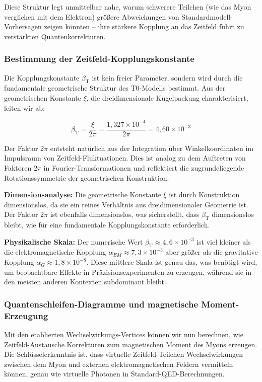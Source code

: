 \documentclass[12pt,a4paper]{article}
\newcommand{\betaT}{\beta_{\text{T}}}
\newcommand{\xipar}{\xi}
\begin{document}
	Diese Struktur legt unmittelbar nahe, warum schwerere Teilchen (wie das Myon verglichen mit dem Elektron) größere Abweichungen von Standardmodell-Vorhersagen zeigen könnten -- ihre stärkere Kopplung an das Zeitfeld führt zu verstärkten Quantenkorrekturen.
	
	\subsubsection{Bestimmung der Zeitfeld-Kopplungskonstante}
	
	Die Kopplungskonstante $\betaT$ ist kein freier Parameter, sondern wird durch die fundamentale geometrische Struktur des T0-Modells bestimmt. Aus der geometrischen Konstante $\xipar$, die dreidimensionale Kugelpackung charakterisiert, leiten wir ab:
	
	\begin{equation}
		\betaT = \frac{\xipar}{2\pi} = \frac{1{,}327 \times 10^{-4}}{2\pi} = 4{,}60 \times 10^{-3}
	\end{equation}
	
	Der Faktor $2\pi$ entsteht natürlich aus der Integration über Winkelkoordinaten im Impulsraum von Zeitfeld-Fluktuationen. Dies ist analog zu dem Auftreten von Faktoren $2\pi$ in Fourier-Transformationen und reflektiert die zugrundeliegende Rotationssymmetrie der geometrischen Konstruktion.
	
	\textbf{Dimensionsanalyse:} Die geometrische Konstante $\xipar$ ist durch Konstruktion dimensionslos, da sie ein reines Verhältnis aus dreidimensionaler Geometrie ist. Der Faktor $2\pi$ ist ebenfalls dimensionslos, was sicherstellt, dass $\betaT$ dimensionslos bleibt, wie für eine fundamentale Kopplungskonstante erforderlich.
	
	\textbf{Physikalische Skala:} Der numerische Wert $\betaT \approx 4{,}6 \times 10^{-3}$ ist viel kleiner als die elektromagnetische Kopplung $\alpha_{EM} \approx 7{,}3 \times 10^{-3}$ aber größer als die gravitative Kopplung $\alpha_G \approx 1{,}8 \times 10^{-8}$. Diese mittlere Skala ist genau das, was benötigt wird, um beobachtbare Effekte in Präzisionsexperimenten zu erzeugen, während sie in den meisten anderen Kontexten subdominant bleibt.
	
	\subsubsection{Quantenschleifen-Diagramme und magnetische Moment-Erzeugung}
	
	Mit den etablierten Wechselwirkungs-Vertices können wir nun berechnen, wie Zeitfeld-Austausche Korrekturen zum magnetischen Moment des Myons erzeugen. Die Schlüsselerkenntnis ist, dass virtuelle Zeitfeld-Teilchen Wechselwirkungen zwischen dem Myon und externen elektromagnetischen Feldern vermitteln können, genau wie virtuelle Photonen in Standard-QED-Berechnungen.
	
\end{document}

